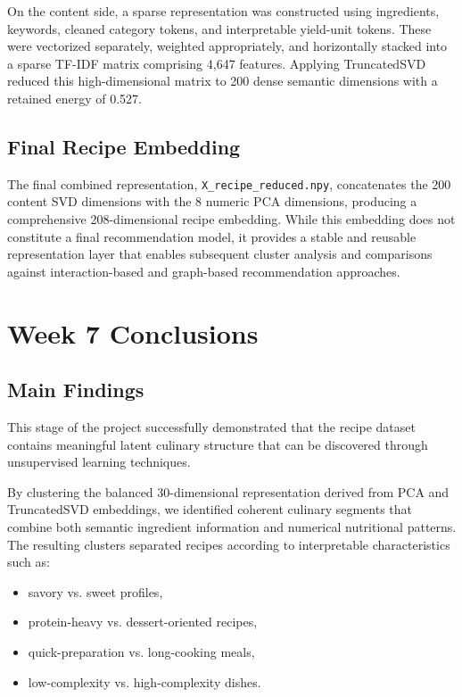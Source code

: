 \documentclass[11pt,a4paper]{article}
\begin{document}
On the content side, a sparse representation was constructed using ingredients, keywords, cleaned category tokens, and interpretable yield-unit tokens. These were vectorized separately, weighted appropriately, and horizontally stacked into a sparse TF-IDF matrix comprising 4,647 features. Applying TruncatedSVD reduced this high-dimensional matrix to 200 dense semantic dimensions with a retained energy of 0.527.

\subsection{Final Recipe Embedding}
The final combined representation, \texttt{X\_recipe\_reduced.npy}, concatenates the 200 content SVD dimensions with the 8 numeric PCA dimensions, producing a comprehensive 208-dimensional recipe embedding. While this embedding does not constitute a final recommendation model, it provides a stable and reusable representation layer that enables subsequent cluster analysis and comparisons against interaction-based and graph-based recommendation approaches.

\section{Week 7 Conclusions}

\subsection{Main Findings}

This stage of the project successfully demonstrated that the recipe dataset contains meaningful latent culinary structure that can be discovered through unsupervised learning techniques.

By clustering the balanced 30-dimensional representation derived from PCA and TruncatedSVD embeddings, we identified coherent culinary segments that combine both semantic ingredient information and numerical nutritional patterns. The resulting clusters separated recipes according to interpretable characteristics such as:
\begin{itemize}
    \item savory vs. sweet profiles,
    \item protein-heavy vs. dessert-oriented recipes,
    \item quick-preparation vs. long-cooking meals,
    \item low-complexity vs. high-complexity dishes.
\end{itemize}
\end{document}
